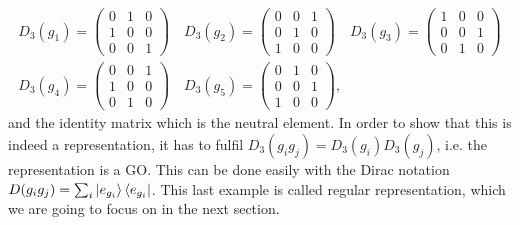 \documentclass[12pt]{book}
\theoremstyle{plain}
\theoremstyle{definition}
\theoremstyle{remark}
\begin{document}
\begin{itemize}
\begin{multline}\label{regularrepresentationD3}D_3(g_1) = \begin{pmatrix}
  0 & 1 & 0\\
  1 & 0 & 0\\
  0 & 0 & 1 
 \end{pmatrix} \quad D_3(g_2) = \begin{pmatrix}
  0 & 0 & 1\\
  0 & 1 & 0\\
  1 & 0 &0 
 \end{pmatrix}\quad D_3(g_3) = \begin{pmatrix}
  1 & 0 & 0\\
  0 & 0 & 1\\
  0 & 1 &0 
 \end{pmatrix}\\
 D_3(g_4) = \begin{pmatrix}
  0 & 0 & 1\\
  1 & 0 & 0\\
  0 & 1 &0 
 \end{pmatrix}\quad D_3(g_5) = \begin{pmatrix}
  0 & 1 & 0\\
  0 & 0 & 1\\
  1 & 0 &0 
 \end{pmatrix},\qquad\qquad\qquad\end{multline}
 and the identity matrix which is the neutral element. In order to show that this is indeed a representation, it has to fulfil $D_3(g_ig_j) = D_3(g_i)D_3(g_j)$, i.e. the representation is a GO. This can be done easily with the Dirac notation $D(g_ig_j) = \sum_i \ket{e_{g_i}}\bra{e_{g_i}}$. This last example is called regular representation, which we are going to focus on in the next section.
\end{itemize}
\end{document}
